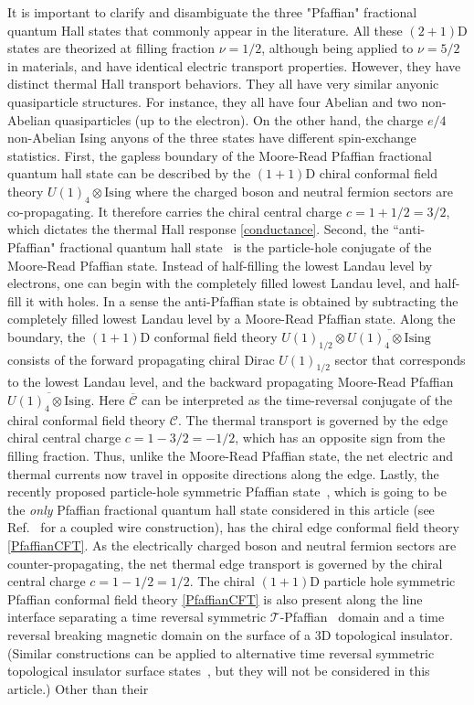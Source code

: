 It is important to clarify and disambiguate the three "Pfaffian" fractional quantum Hall states that commonly appear in the literature. All these $(2+1)$D states are theorized at filling fraction $\nu=1/2$, although being applied to $\nu=5/2$ in materials, and have identical electric transport properties. However, they have distinct thermal Hall transport behaviors. They all have very similar anyonic quasiparticle structures. For instance, they all have four Abelian and two non-Abelian quasiparticles (up to the electron). On the other hand, the charge $e/4$ non-Abelian Ising anyons of the three states have different spin-exchange statistics. First, the gapless boundary of the Moore-Read Pfaffian fractional quantum hall state can be described by the $(1+1)$D chiral conformal field theory $U(1)_4\otimes\mathrm{Ising}$ where the charged boson and neutral fermion sectors are co-propagating. It therefore carries the chiral central charge $c=1+1/2=3/2$, which dictates the thermal Hall response \eqref{conductance}. Second, the ``anti-Pfaffian" fractional quantum hall state~\cite{LevinHalperinRosenow07,LeeRyuNayakFisher07} is the particle-hole conjugate of the Moore-Read Pfaffian state. Instead of half-filling the lowest Landau level by electrons, one can begin with the completely filled lowest Landau level, and half-fill it with holes. In a sense the anti-Pfaffian state is obtained by subtracting the completely filled lowest Landau level by a Moore-Read Pfaffian state. Along the boundary, the $(1+1)$D conformal field theory $U(1)_{1/2}\otimes\overline{U(1)_4\otimes\mathrm{Ising}}$ consists of the forward propagating chiral Dirac $U(1)_{1/2}$ sector that corresponds to the lowest Landau level, and the backward propagating Moore-Read Pfaffian $\overline{U(1)_4\otimes\mathrm{Ising}}$. Here $\overline{\mathcal{C}}$ can be interpreted as the time-reversal conjugate of the chiral conformal field theory $\mathcal{C}$. The thermal transport is governed by the edge chiral central charge $c=1-3/2=-1/2$, which has an opposite sign from the filling fraction. Thus, unlike the Moore-Read Pfaffian state, the net electric and thermal currents now travel in opposite directions along the edge. Lastly, the recently proposed particle-hole symmetric Pfaffian state~\cite{Son15,BarkeshliMulliganFisher15,WangSenthil16}, which is going to be the {\em only} Pfaffian fractional quantum hall state considered in this article (see Ref.~ for a coupled wire construction), has the chiral edge conformal field theory \eqref{PfaffianCFT}. As the electrically charged boson and neutral fermion sectors are counter-propagating, the net thermal edge transport is governed by the chiral central charge $c=1-1/2=1/2$. The chiral $(1+1)$D particle hole symmetric Pfaffian conformal field theory \eqref{PfaffianCFT} is also present along the line interface separating a time reversal symmetric $\mathcal{T}$-Pfaffian~\cite{ChenFidkowskiVishwanath14} domain and a time reversal breaking magnetic domain on the surface of a 3D topological insulator. (Similar constructions can be applied to alternative time reversal symmetric topological insulator surface states~\cite{WangPotterSenthilgapTI13,MetlitskiKaneFisher13b,BondersonNayakQi13}, but they will not be considered in this article.) Other than their 